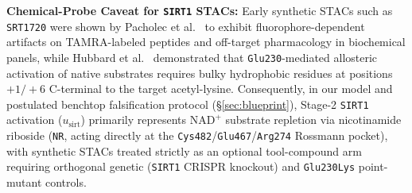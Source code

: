 \documentclass[11pt]{article}
\theoremstyle{plain}
\theoremstyle{remark}
\begin{document}
\textbf{Chemical-Probe Caveat for \texttt{SIRT1} STACs:} Early synthetic STACs such as \texttt{SRT1720} were shown by Pacholec et al.~\cite{pacholec2010sirt1} to exhibit fluorophore-dependent artifacts on TAMRA-labeled peptides and off-target pharmacology in biochemical panels, while Hubbard et al.~\cite{hubbard2013sirt1} demonstrated that \texttt{Glu230}-mediated allosteric activation of native substrates requires bulky hydrophobic residues at positions $+1/+6$ C-terminal to the target acetyl-lysine. Consequently, in our model and postulated benchtop falsification protocol (\S\ref{sec:blueprint}), Stage-2 \texttt{SIRT1} activation ($u_{\mathrm{sirt}}$) primarily represents $\text{NAD}^+$ substrate repletion via nicotinamide riboside (\texttt{NR}, acting directly at the \texttt{Cys482}/\texttt{Glu467}/\texttt{Arg274} Rossmann pocket), with synthetic STACs treated strictly as an optional tool-compound arm requiring orthogonal genetic (\texttt{SIRT1} CRISPR knockout) and \texttt{Glu230Lys} point-mutant controls.
\end{document}

